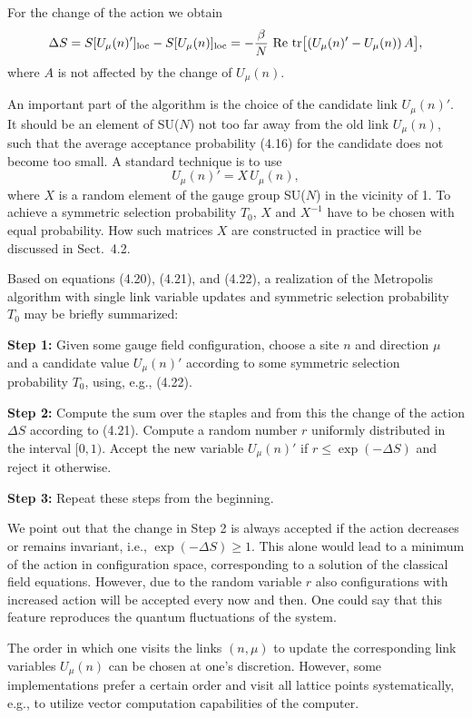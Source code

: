 For the change of the action we obtain
\begin{equation}
  \Delta S = S[U_\mu(n)']_{\mathrm{loc}} - S[U_\mu(n)]_{\mathrm{loc}} = -\frac{\beta}{N}\,\operatorname{Re}\,\operatorname{tr}\!\big[(U_\mu(n)' - U_\mu(n))\,A\big],
\end{equation}
where $A$ is not affected by the change of $U_\mu(n)$.

An important part of the algorithm is the choice of the candidate link
$U_\mu(n)'$. It should be an element of SU($N$) not too far away from the old link
$U_\mu(n)$, such that the average acceptance probability (4.16) for the candidate
does not become too small. A standard technique is to use
\begin{equation}
  U_\mu(n)' = X\,U_\mu(n),
\end{equation}
where $X$ is a random element of the gauge group SU($N$) in the vicinity of 1.
To achieve a symmetric selection probability $T_0$, $X$ and $X^{-1}$ have to be chosen
with equal probability. How such matrices $X$ are constructed in practice will
be discussed in Sect.~4.2.

Based on equations (4.20), (4.21), and (4.22), a realization of the Metropolis algorithm with single link variable updates and symmetric selection probability $T_0$ may be briefly summarized:

\textbf{Step 1:} Given some gauge field configuration, choose a site $n$ and direction
$\mu$ and a candidate value $U_\mu(n)'$ according to some symmetric selection
probability $T_0$, using, e.g., (4.22).

\textbf{Step 2:} Compute the sum over the staples and from this the change of the
action $\Delta S$ according to (4.21). Compute a random number $r$ uniformly
distributed in the interval $[0,1)$. Accept the new variable $U_\mu(n)'$ if $r \leq \exp(-\Delta S)$ and reject it otherwise.

\textbf{Step 3:} Repeat these steps from the beginning.

We point out that the change in Step 2 is always accepted if the action decreases or remains invariant, i.e., $\exp(-\Delta S) \geq 1$. This alone would lead to
a minimum of the action in configuration space, corresponding to a solution
of the classical field equations. However, due to the random variable $r$ also
configurations with increased action will be accepted every now and then.
One could say that this feature reproduces the quantum fluctuations of the
system.

The order in which one visits the links $(n, \mu)$ to update the corresponding
link variables $U_\mu(n)$ can be chosen at one's discretion. However, some implementations prefer a certain order and visit all lattice points systematically,
e.g., to utilize vector computation capabilities of the computer.


